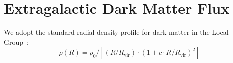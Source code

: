 \documentclass[%
 reprint,
 amsmath,amssymb,
 aps,
]{revtex4-2}
\begin{document}







\section{Extragalactic Dark Matter Flux}
\label{sec:darkmatter}
We adopt the standard radial density profile for dark matter in the Local Group~\cite{Navarro1997,Klypin2002,Rubin2014}:
\begin{equation}
\rho(R) = \rho_0 / [(R/R_{\text{vir}}) \cdot (1 + c \cdot R/R_{\text{vir}})^2]
\end{equation}
\end{document}
